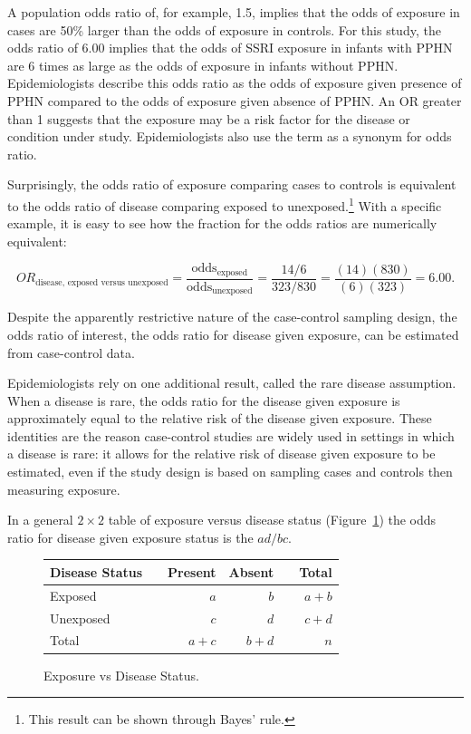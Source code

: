 \textD{\newpage}

A population odds ratio of, for example, 1.5, implies that the odds of exposure in cases are 50\% larger than the odds of exposure in controls. For this study, the odds ratio of 6.00 implies that the odds of SSRI exposure in infants with PPHN are 6 times as large as the odds of exposure in infants without PPHN. Epidemiologists describe this odds ratio as the odds of exposure given presence of PPHN compared to the odds of exposure given absence of PPHN. An OR greater than 1 suggests that the exposure may be a risk factor for the disease or condition under study.  Epidemiologists also use the term  as a synonym for odds ratio.

Surprisingly, the odds ratio of exposure comparing cases to controls is equivalent to the odds ratio of disease comparing exposed to unexposed.\footnote{This result can be shown through Bayes' rule.} With a specific example, it is easy to see how the fraction for the odds ratios are numerically equivalent:

\[OR_{\text{disease, exposed versus unexposed}} = \frac{\text{odds$_\text{exposed}$}}{\text{odds$_\text{unexposed}$}} = \frac{14/6}{323/830} = \frac{(14)(830)}{(6)(323)} = 6.00. \]

Despite the apparently restrictive nature of the case-control sampling design, the odds ratio of interest, the odds ratio for disease given exposure, can be estimated from case-control data.

Epidemiologists rely on one additional result, called the rare disease assumption. When a disease is rare, the odds ratio for the disease given exposure is approximately equal to the relative risk of the disease given exposure.  These identities are the reason case-control studies are widely used in settings in which a disease is rare: it allows for the relative risk of disease given exposure to be estimated, even if the study design is based on sampling cases and controls then measuring exposure.

In a general $2 \times 2$ table of exposure versus disease status (Figure~\ref{generalTwoByTwoTable}) the odds ratio for disease given exposure status is the $ad/bc$.
 \begin{figure}[h]
	\centering
	\begin{tabular}{ll rrr r}
		\hline
		Disease Status  & \hspace{2mm} & Present & Absent & \hspace{2mm} & Total \\
		\hline
		Exposed &	& $a$ & $b$ &  & $a + b$  \\
		Unexposed & & $c$ & $d$ &  & $c + d $  \\
        Total & & $a + c$ & $b + d$ & & $n$ \\
		\hline
	\end{tabular}
    \caption{Exposure vs Disease Status.}
    \label{generalTwoByTwoTable}
\end{figure}	

